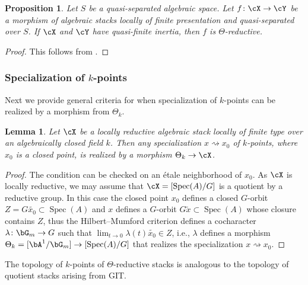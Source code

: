 \documentclass[a4paper]{amsart}
\numberwithin{equation}{section}
\theoremstyle{plain}
\newtheorem{lem}[thm]{Lemma}
\newtheorem{prop}[thm]{Proposition}
\theoremstyle{definition}
\DeclareMathOperator{\Spec}{Spec}
\newcommand{\co}{\colon}
\begin{document}
\begin{prop}  \label{P:quasi-finite-theta-reductive}
	{Let $S$ be a quasi-separated algebraic space.}
	Let $f \co \cX \to \cY$ be a morphism of algebraic stacks {locally of finite presentation and quasi-separated over $S$.}  {If $\cX$ and $\cY$ have quasi-finite inertia, then $f$} is $\Theta$-reductive.
\end{prop}

\begin{proof}
This follows from .
\end{proof}



\subsubsection{Specialization of $k$-points}
Next we provide general criteria for when specialization of $k$-points can be realized by a morphism from $\Theta_k$. 


\begin{lem} \label{L:isotrivial}
Let $\cX$ be a locally reductive algebraic stack locally of finite type over {an algebraically closed field $k$}.
Then any specialization $x \rightsquigarrow x_0$ of $k$-points, where $x_0$ is a closed point, is realized by a morphism $\Theta_k \to \cX$.
\end{lem}

\begin{proof}
The condition can be checked on an \'etale neighborhood of $x_0$. As $\cX$ is locally reductive, we may assume that $\cX=[\Spec(A)/G]$ is a quotient by a reductive group. {In this case the closed point $x_0$ defines a closed $G$-orbit $Z=G\tilde{x_0}\subset \Spec(A)$ and $x$ defines a $G$-orbit $G\tilde{x}\subset \Spec(A)$ whose closure contains $Z$, thus the Hilbert--Mumford criterion \cite[Thm.~4.2]{kempf1978instability} defines a cocharacter $\lambda \colon \bG_m \to G$ such that $\lim_{t \to 0}\lambda(t)\tilde{x_0}\in Z$, i.e., $\lambda$ defines a morphism $\Theta_{k}=[\bA^1/\bG_m] \to [\Spec(A)/G]$ that realizes the specialization $x\rightsquigarrow x_0$.}
\end{proof}


The topology of $k$-points of $\Theta$-reductive stacks is analogous to the topology of quotient stacks arising from GIT.  
\end{document}
